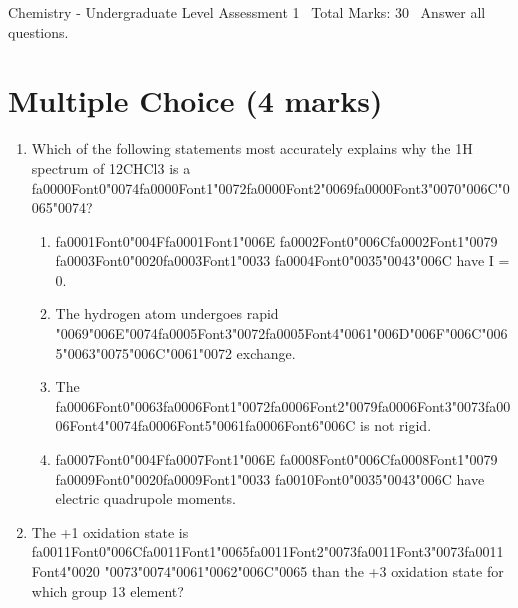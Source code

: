 \documentclass[12pt]{article}
\begin{document}
\begin{center}
Chemistry - Undergraduate Level Assessment 1 \
Total Marks: 30 \
Answer all questions.
\end{center}

\section*{Multiple Choice (4 marks)}
\begin{enumerate}[label=\arabic*.]
\item Which of the following statements most accurately explains why the 1H spectrum of 12CHCl3 is a {\csname fa0000Font0\endcsname\char"0074}{\csname fa0000Font1\endcsname\char"0072}{\csname fa0000Font2\endcsname\char"0069}{\csname fa0000Font3\endcsname\char"0070}{\char"006C}{\char"0065}{\char"0074}?
\begin{enumerate}[label=(\alph*)]
    \item {\csname fa0001Font0\endcsname\char"004F}{\csname fa0001Font1\endcsname\char"006E} {\csname fa0002Font0\endcsname\char"006C}{\csname fa0002Font1\endcsname\char"0079} {\csname fa0003Font0\endcsname\char"0020}{\csname fa0003Font1\endcsname\char"0033} {\csname fa0004Font0\endcsname\char"0035}{\char"0043}{\char"006C} have I = 0.
    \item The hydrogen atom undergoes rapid {\char"0069}{\char"006E}{\char"0074}{\csname fa0005Font3\endcsname\char"0072}{\csname fa0005Font4\endcsname\char"0061}{\char"006D}{\char"006F}{\char"006C}{\char"0065}{\char"0063}{\char"0075}{\char"006C}{\char"0061}{\char"0072} exchange.
    \item The {\csname fa0006Font0\endcsname\char"0063}{\csname fa0006Font1\endcsname\char"0072}{\csname fa0006Font2\endcsname\char"0079}{\csname fa0006Font3\endcsname\char"0073}{\csname fa0006Font4\endcsname\char"0074}{\csname fa0006Font5\endcsname\char"0061}{\csname fa0006Font6\endcsname\char"006C} is not rigid.
    \item {\csname fa0007Font0\endcsname\char"004F}{\csname fa0007Font1\endcsname\char"006E} {\csname fa0008Font0\endcsname\char"006C}{\csname fa0008Font1\endcsname\char"0079} {\csname fa0009Font0\endcsname\char"0020}{\csname fa0009Font1\endcsname\char"0033} {\csname fa0010Font0\endcsname\char"0035}{\char"0043}{\char"006C} have electric quadrupole moments.
\end{enumerate}
\item The +1 oxidation state is {\csname fa0011Font0\endcsname\char"006C}{\csname fa0011Font1\endcsname\char"0065}{\csname fa0011Font2\endcsname\char"0073}{\csname fa0011Font3\endcsname\char"0073}{\csname fa0011Font4\endcsname\char"0020} {\char"0073}{\char"0074}{\char"0061}{\char"0062}{\char"006C}{\char"0065} than the +3 oxidation state for which group 13 element?

\end{enumerate}
\end{document}
